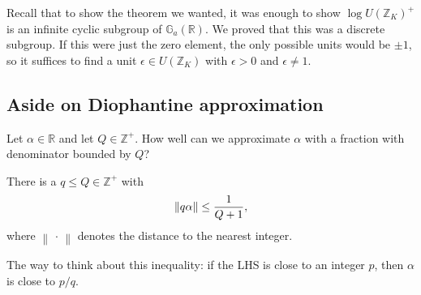 \begin{remark}

Recall that to show the theorem we wanted, it was enough to show
\(\log U({\mathbb{Z}}_K)^+\) is an infinite cyclic subgroup of
\({\mathbb{G}}_a({\mathbb{R}})\). We proved that this was a discrete
subgroup. If this were just the zero element, the only possible units
would be \(\pm 1\), so it suffices to find a unit
\(\epsilon \in U({\mathbb{Z}}_K)\) with \(\epsilon>0\) and
\(\epsilon\neq 1\).

\end{remark}

\hypertarget{aside-on-diophantine-approximation}{%
\subsection{Aside on Diophantine
approximation}\label{aside-on-diophantine-approximation}}

\begin{remark}

Let \(\alpha\in {\mathbb{R}}\) and let \(Q \in {\mathbb{Z}}^+\). How
well can we approximate \(\alpha\) with a fraction with denominator
bounded by \(Q\)?

\end{remark}

\begin{theorem}[Dirichlet]

There is a \(q \leq Q \in {\mathbb{Z}}^+\) with
\begin{align*} 
{\left\lVert {q \alpha } \right\rVert} \leq {1 \over Q+1} 
,\end{align*}
where \({\left\lVert {{\,\cdot\,}} \right\rVert}\) denotes the distance
to the nearest integer.

\end{theorem}

\begin{remark}

The way to think about this inequality: if the LHS is close to an
integer \(p\), then \(\alpha\) is close to \(p/q\).

\end{remark}

